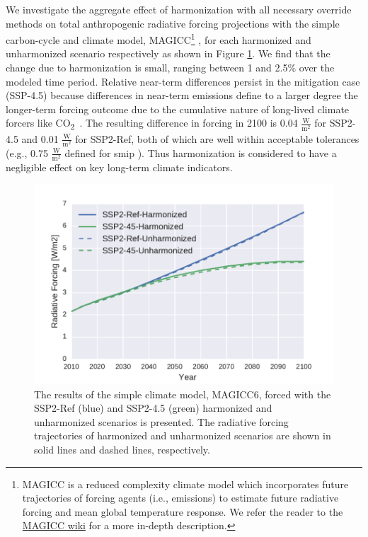 \documentclass[review]{elsarticle}
\newcommand{\cotwo}{CO\textsubscript{2}~}
\begin{document}
We investigate the aggregate effect of harmonization with all necessary override
methods on total anthropogenic radiative forcing projections with the simple
carbon-cycle and climate model, MAGICC\footnote{MAGICC is a reduced complexity
  climate model which incorporates future trajectories of forcing agents (i.e.,
  emissions) to estimate future radiative forcing and mean global temperature
  response. We refer the reader to the
  \href{http://wiki.magicc.org/index.php?title=Model_Description}{MAGICC wiki}
  for a more in-depth description.} \cite{meinshausen2011emulating,
  meinshausen2011rcp}, for each harmonized and unharmonized scenario
respectively as shown in Figure \ref{fig:forcing}. We find that the change due
to harmonization is small, ranging between 1 and 2.5\% over the modeled time
period. Relative near-term differences persist in the mitigation case (SSP-4.5)
because differences in near-term emissions define to a larger degree the
longer-term forcing outcome due to the cumulative nature of long-lived climate
forcers like \cotwo.  The resulting difference in forcing in 2100 is 0.04
$\frac{\text{W}}{\text{m}^2}$ for SSP2-4.5 and 0.01
$\frac{\text{W}}{\text{m}^2}$ for SSP2-Ref, both of which are well within
acceptable tolerances (e.g., 0.75 $\frac{\text{W}}{\text{m}^2}$ defined for
\gls{smip} \cite{oneill_scenario_2016}). Thus harmonization is considered to
have a negligible effect on key long-term climate indicators.

\begin{figure}
  \begin{center}
    \includegraphics[width=\textwidth]{results_forcing.pdf}
    \caption[]{
      \label{fig:forcing}
      The results of the simple climate model, MAGICC6, forced with the SSP2-Ref
      (blue) and SSP2-4.5 (green) harmonized and unharmonized scenarios is
      presented. The radiative forcing trajectories of harmonized and
      unharmonized scenarios are shown in solid lines and dashed lines,
      respectively.  }
  \end{center}
\end{figure}
\end{document}
